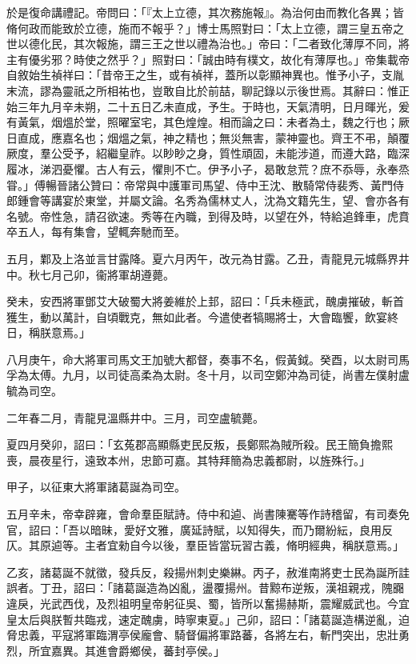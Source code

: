 \begin{pinyinscope}
於是復命講禮記。帝問曰：「『太上立德，其次務施報』。為治何由而教化各異；皆脩何政而能致於立德，施而不報乎？」博士馬照對曰：「太上立德，謂三皇五帝之世以德化民，其次報施，謂三王之世以禮為治也。」帝曰：「二者致化薄厚不同，將主有優劣邪？時使之然乎？」照對曰：「誠由時有樸文，故化有薄厚也。」帝集載帝自敘始生禎祥曰：「昔帝王之生，或有禎祥，蓋所以彰顯神異也。惟予小子，支胤末流，謬為靈祇之所相祐也，豈敢自比於前喆，聊記錄以示後世焉。其辭曰：惟正始三年九月辛未朔，二十五日乙未直成，予生。于時也，天氣清明，日月暉光，爰有黃氣，烟熅於堂，照曜室宅，其色煌煌。相而論之曰：未者為土，魏之行也；厥日直成，應嘉名也；烟熅之氣，神之精也；無災無害，蒙神靈也。齊王不弔，顛覆厥度，羣公受予，紹繼皇祚。以眇眇之身，質性頑固，未能涉道，而遵大路，臨深履冰，涕泗憂懼。古人有云，懼則不亡。伊予小子，曷敢怠荒？庶不忝辱，永奉烝甞。」傅暢晉諸公贊曰：帝常與中護軍司馬望、侍中王沈、散騎常侍裴秀、黃門侍郎鍾會等講宴於東堂，并屬文論。名秀為儒林丈人，沈為文籍先生，望、會亦各有名號。帝性急，請召欲速。秀等在內職，到得及時，以望在外，特給追鋒車，虎賁卒五人，每有集會，望輒奔馳而至。

五月，鄴及上洛並言甘露降。夏六月丙午，改元為甘露。乙丑，青龍見元城縣界井中。秋七月己卯，衞將軍胡遵薨。

癸未，安西將軍鄧艾大破蜀大將姜維於上邽，詔曰：「兵未極武，醜虜摧破，斬首獲生，動以萬計，自頃戰克，無如此者。今遣使者犒賜將士，大會臨饗，飲宴終日，稱朕意焉。」

八月庚午，命大將軍司馬文王加號大都督，奏事不名，假黃鉞。癸酉，以太尉司馬孚為太傅。九月，以司徒高柔為太尉。冬十月，以司空鄭沖為司徒，尚書左僕射盧毓為司空。

二年春二月，青龍見溫縣井中。三月，司空盧毓薨。

夏四月癸卯，詔曰：「玄菟郡高顯縣吏民反叛，長鄭熙為賊所殺。民王簡負擔熙喪，晨夜星行，遠致本州，忠節可嘉。其特拜簡為忠義都尉，以旌殊行。」

甲子，以征東大將軍諸葛誕為司空。

五月辛未，帝幸辟雍，會命羣臣賦詩。侍中和逌、尚書陳騫等作詩稽留，有司奏免官，詔曰：「吾以暗昧，愛好文雅，廣延詩賦，以知得失，而乃爾紛紜，良用反仄。其原逌等。主者宜勑自今以後，羣臣皆當玩習古義，脩明經典，稱朕意焉。」

乙亥，諸葛誕不就徵，發兵反，殺揚州刺史樂綝。丙子，赦淮南將吏士民為誕所詿誤者。丁丑，詔曰：「諸葛誕造為凶亂，盪覆揚州。昔黥布逆叛，漢祖親戎，隗嚻違戾，光武西伐，及烈祖明皇帝躬征吳、蜀，皆所以奮揚赫斯，震耀威武也。今宜皇太后與朕暫共臨戎，速定醜虜，時寧東夏。」己卯，詔曰：「諸葛誕造構逆亂，迫脅忠義，平寇將軍臨渭亭侯龐會、騎督偏將軍路蕃，各將左右，斬門突出，忠壯勇烈，所宜嘉異。其進會爵鄉侯，蕃封亭侯。」


\end{pinyinscope}
